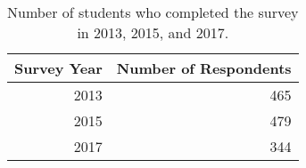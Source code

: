 \documentclass[11pt]{article}
\begin{document}
\begin{table}[h]
\centering
\caption{Number of students who completed the survey in 2013, 2015, and 2017.} 
\begin{tabular}{rr}
  \hline
\multicolumn{1}{c}{\textbf{Survey Year}} & \multicolumn{1}{c}{\textbf{Number of Respondents}} \\ 
  \hline
2013 & 465 \\ 
  2015 & 479 \\ 
  2017 & 344 \\ 
   \hline
\end{tabular}
\end{table}
\captionsetup{width=\textwidth, singlelinecheck=false, justification= raggedright}
\end{document}
